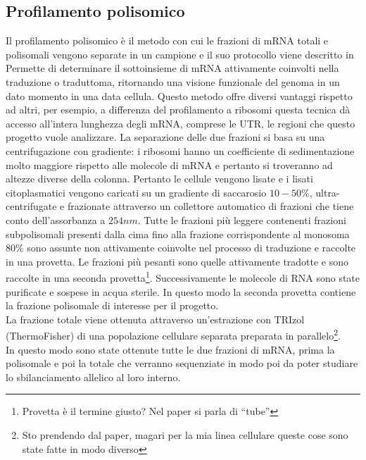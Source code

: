 \subsection{Profilamento polisomico}
Il profilamento polisomico \`e il metodo con cui le frazioni di mRNA totali e polisomali vengono separate in un campione e il suo protocollo viene descritto in \cite{polprofiling}
Permette di determinare il sottoinsieme di mRNA attivamente coinvolti nella traduzione o traduttoma, ritornando una visione funzionale del genoma in un dato momento in una data cellula.
Questo metodo offre diversi vantaggi rispetto ad altri, per esempio, a differenza del profilamento a ribosomi questa tecnica d\`a accesso all'intera lunghezza degli mRNA, comprese le UTR, le regioni che questo progetto vuole analizzare.
La separazione delle due frazioni si basa su una centrifugazione con gradiente: i ribosomi hanno un coefficiente di sedimentazione molto maggiore rispetto alle molecole di mRNA e pertanto si troveranno ad altezze diverse della colonna.
Pertanto le cellule vengono lisate e i lisati citoplasmatici vengono caricati su un gradiente di saccarosio $10-50\%$, ultra-centrifugate e frazionate attraverso un collettore automatico di frazioni che tiene conto dell'assorbanza a $254nm$.
Tutte le frazioni pi\`u leggere contenenti frazioni subpolisomali presenti dalla cima fino alla frazione corrispondente al monosoma $80\%$ sono assunte non attivamente coinvolte nel processo di traduzione e raccolte in una provetta.
Le frazioni pi\`u pesanti sono quelle attivamente tradotte e sono raccolte in una seconda provetta\footnote{Provetta \`e il termine giusto? Nel paper si parla di ``tube''}.
Successivamente le molecole di RNA sono state purificate e sospese in acqua sterile.
In questo modo la seconda provetta contiene la frazione polisomale di interesse per il progetto.\\
La frazione totale viene ottenuta attraverso un'estrazione con TRIzol (ThermoFisher) di una popolazione cellulare separata preparata in parallelo\footnote{Sto prendendo dal paper, magari per la mia linea cellulare queste cose sono state fatte in modo diverso}.\\
In questo modo sono state ottenute tutte le due frazioni di mRNA, prima la polisomale e poi la totale che verranno sequenziate in modo poi da poter studiare lo sbilanciamento allelico al loro interno.

